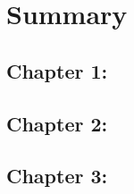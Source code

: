 \chapter*{Summary}
\cleardoublepage

\section*{Chapter 1: }


\section*{Chapter 2: }


\section*{Chapter 3: }
